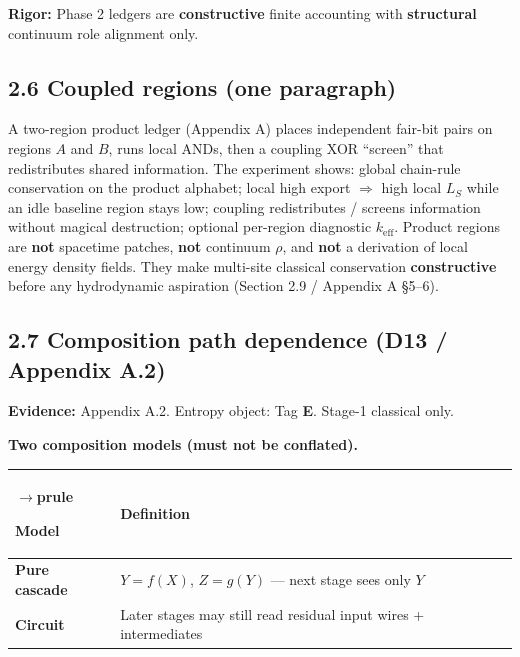 \documentclass[
  11pt,
]{article}
\newcounter{none} %
\begin{document}
\textbf{Rigor:} Phase 2 ledgers are \textbf{constructive} finite accounting with \textbf{structural} continuum role alignment only.

\subsection{2.6 Coupled regions (one paragraph)}\label{coupled-regions-one-paragraph}

A two-region product ledger (Appendix A) places independent fair-bit pairs on regions \(A\) and \(B\), runs local ANDs, then a coupling XOR ``screen'' that redistributes shared information. The experiment shows: global chain-rule conservation on the product alphabet; local high export \(\Rightarrow\) high local \(L_S\) while an idle baseline region stays low; coupling redistributes / screens information without magical destruction; optional per-region diagnostic \(k_{\mathrm{eff}}\). Product regions are \textbf{not} spacetime patches, \textbf{not} continuum \(\rho\), and \textbf{not} a derivation of local energy density fields. They make multi-site classical conservation \textbf{constructive} before any hydrodynamic aspiration (Section 2.9 / Appendix A \S5--6).

\subsection{2.7 Composition path dependence (D13 / Appendix A.2)}\label{composition-path-dependence-d13-appendix-a.2}

\textbf{Evidence:} Appendix A.2. Entropy object: Tag \textbf{E}. Stage-1 classical only.

\textbf{Two composition models (must not be conflated).}

{\def\LTcaptype{none} %
\begin{longtable}[]{@{}
  >{\raggedright\arraybackslash}p{}
  >{\raggedright\arraybackslash}p{}@{}}
$\rightarrow$prule\noalign{}
\begin{minipage}[b]{\linewidth}\raggedright
Model
\end{minipage} & \begin{minipage}[b]{\linewidth}\raggedright
Definition
\end{minipage} \\
\midrule\noalign{}
\endhead
\bottomrule\noalign{}
\endlastfoot
\textbf{Pure cascade} & \(Y=f(X)\), \(Z=g(Y)\) --- next stage sees only \(Y\) \\
\textbf{Circuit} & Later stages may still read residual input wires + intermediates \\
\end{longtable}
}
\end{document}
